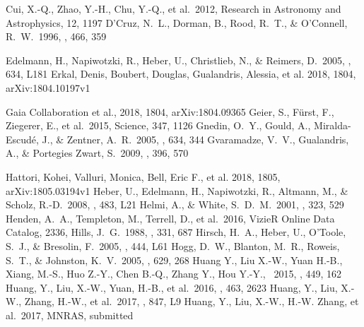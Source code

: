 \documentclass[iop, aj]{emulateapj}
\begin{document}
\begin{thebibliography}{}
 Cui, X.-Q., Zhao, Y.-H., Chu, Y.-Q., et al.\ 2012, Research in Astronomy and Astrophysics, 12, 1197
 D'Cruz, N.~L., Dorman, B., Rood, R.~T., \& O'Connell, R.~W.\ 1996, \apj, 466, 359

 Edelmann, H., Napiwotzki, R., Heber, U., Christlieb, N., \& Reimers, D.\ 2005, \apjl, 634, L181
 Erkal, Denis, Boubert, Douglas, Gualandris, Alessia, et al. 2018, 1804, arXiv:1804.10197v1

 Gaia Collaboration et al., 2018, 1804, arXiv:1804.09365
 Geier, S., F{\"u}rst, F., Ziegerer, E., et al.\ 2015, Science, 347, 1126
 Gnedin, O.~Y., Gould, A., Miralda-Escud{\'e}, J., \& Zentner, A.~R.\ 2005, \apj, 634, 344
 Gvaramadze, V.~V., Gualandris, A., \& Portegies Zwart, S.\ 2009, \mnras, 396, 570


 Hattori, Kohei, Valluri, Monica, Bell, Eric F., et al. 2018, 1805, arXiv:1805.03194v1
 Heber, U., Edelmann, H., Napiwotzki, R., Altmann, M., \& Scholz, R.-D.\ 2008, \aap, 483, L21
 Helmi, A., \& White, S.~D.~M.\ 2001, \mnras, 323, 529
 Henden, A.~A., Templeton, M., Terrell, D., et al.\ 2016, VizieR Online Data Catalog, 2336,
 Hills, J.~G.\ 1988, \nat, 331, 687
 Hirsch, H.~A., Heber, U., O'Toole, S.~J., \& Bresolin, F.\ 2005, \aap, 444, L61
 Hogg, D.~W., Blanton, M.~R., Roweis, S.~T., \& Johnston, K.~V.\ 2005, \apj, 629, 268
 Huang Y., Liu X.-W., Yuan H.-B., Xiang, M.-S., Huo Z.-Y., Chen B.-Q., Zhang Y., Hou Y.-Y., \ 2015, \mnras, 449, 162
 Huang, Y., Liu, X.-W., Yuan, H.-B., et al.\ 2016, \mnras, 463, 2623
 Huang, Y., Liu, X.-W., Zhang, H.-W., et al.\ 2017, \apjl, 847, L9
 Huang, Y., Liu, X.-W., H.-W. Zhang, et al.\ 2017, MNRAS, submitted


\end{thebibliography}
\end{document}
